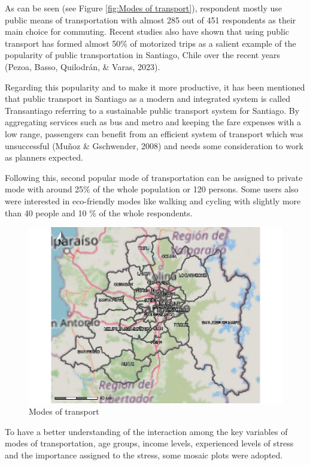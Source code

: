 \documentclass[
11pt, %
oneside, %
english, %
singlespacing, %
]{macthesis} %
\begin{document}
As can be seen (see Figure \ref{fig:Modes of transport}), respondent mostly use public means of transportation with almost 285 out of 451 respondents as their main choice for commuting. Recent studies also have shown that using public transport has formed almost 50\% of motorized trips as a salient example of the popularity of public transportation in Santiago, Chile over the recent years (Pezoa, Basso, Quilodrán, \& Varas, 2023).

Regarding this popularity and to make it more productive, it has been mentioned that public transport in Santiago as a modern and integrated system is called Transantiago referring to a sustainable public transport system for Santiago. By aggregating services such as bus and metro and keeping the fare expenses with a low range, passengers can benefit from an efficient system of transport which was unsuccessful (Muñoz \& Gschwender, 2008) and needs some consideration to work as planners expected.

Following this, second popular mode of transportation can be assigned to private mode with around 25\% of the whole population or 120 persons. Some users also were interested in eco-friendly modes like walking and cycling with slightly more than 40 people and 10 \% of the whole respondents.
\begin{figure}

{\centering \includegraphics[width=0.85\linewidth]{thesis_files/figure-latex/unnamed-chunk-21-1} 

}

\caption{\label{fig:Modes of transport}Modes of transport}\label{fig:unnamed-chunk-21}
\end{figure}
To have a better understanding of the interaction among the key variables of modes of transportation, age groups, income levels, experienced levels of stress and the importance assigned to the stress, some mosaic plots were adopted.
\end{document}
